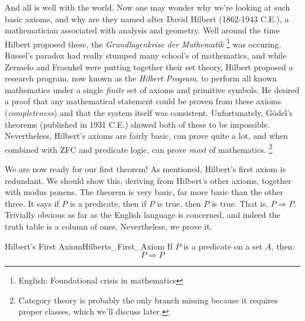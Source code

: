     And all is well with the world. Now one may wonder why we're looking at such
    basic axioms, and why are they named after David Hilbert (1862-1943 C.E.),
    a mathematician associated with analysis and geometry. Well around the
    time Hilbert proposed these, the \textit{Grundlagenkrise der Mathematik}%
    \footnote{English: Foundational crisis in mathematics}
    was occuring. Russel's paradox had really stumped many school's of
    mathematics, and while Zermelo and Fraenkel were putting together their
    set theory, Hilbert proposed a research program, now known as the
    \textit{Hilbert Program}, to perform all known
    mathematics under a single \textit{finite} set of axioms and primitive
    symbols. He desired a proof that any mathematical statement could be proven
    from these axioms (\textit{completeness}) and that the system itself was
    consistent. Unfortunately, G\"{o}del's theorems (published in 1931 C.E.)
    showed both of these to be impossible. Nevertheless, Hilbert's axioms are
    fairly basic, can prove quite a lot, and when combined with \gls{ZFC} and
    predicate logic, can prove \textit{most} of mathematics.%
    \footnote{%
        Category theory is probably the only branch missing because it requires
        proper classes, which we'll discuss later.
    }
    \par\hfill\par
    We are now ready for our first theorem! As mentioned, Hilbert's first
    axiom is redundant. We should show this, deriving from Hilbert's other
    axioms, together with modus ponens. The theorem is very basic, far more
    basic than the other three. It says if $P$ is a predicate, then
    if $P$ is true, then $P$ is true. That is, $P\Rightarrow{P}$. Trivially
    obvious as far as the English language is concerned, and indeed the truth
    table is a column of ones. Nevertheless, we prove it.
    \begin{ftheorem}{Hilbert's First Axiom}{Hilberts_First_Axiom}
        If $P$ is a \gls{predicate} on a \gls{set} $A$, then:
        \begin{equation*}
            P\Rightarrow{P}
        \end{equation*}
    \end{ftheorem}
